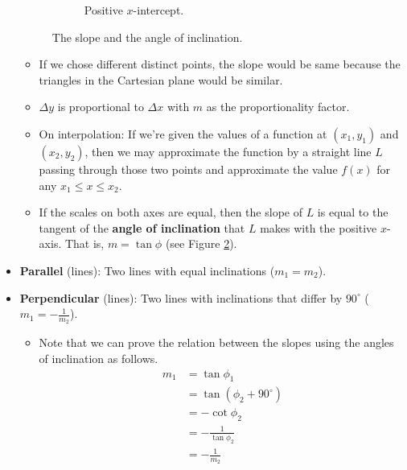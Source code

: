 \documentclass[../main.tex]{subfiles}
\begin{document}
\begin{itemize}
\begin{figure}[h!]
\begin{subfigure}[b]{0.3\linewidth}
            \caption{Positive $x$-intercept.}
            \label{fig:angleOfInclinationb}
        \end{subfigure}
        \caption{The slope and the angle of inclination.}
        \label{fig:angleOfInclination}
    \end{figure}
    \begin{itemize}
        \item If we chose different distinct points, the slope would be same because the triangles in the Cartesian plane would be similar.
        \item $\Delta y$ is proportional to $\Delta x$ with $m$ as the proportionality factor.
        \item On interpolation: If we're given the values of a function at $(x_1,y_1)$ and $(x_2,y_2)$, then we may approximate the function by a straight line $L$ passing through those two points and approximate the value $f(x)$ for any $x_1\leq x\leq x_2$.
        \item If the scales on both axes are equal, then the slope of $L$ is equal to the tangent of the \textbf{angle of inclination} that $L$ makes with the positive $x$-axis. That is, $m=\tan\phi$ (see Figure \ref{fig:angleOfInclination}).
    \end{itemize}
    \item \textbf{Parallel} (lines): Two lines with equal inclinations ($m_1=m_2$).
    \item \textbf{Perpendicular} (lines): Two lines with inclinations that differ by $90^\circ$ ($m_1=-\frac{1}{m_2}$).
    \begin{itemize}
        \item Note that we can prove the relation between the slopes using the angles of inclination as follows.
        \begin{align*}
            m_1 &= \tan\phi_1\\
            &= \tan\left( \phi_2+90^\circ \right)\\
            &= -\cot\phi_2\\
            &= -\frac{1}{\tan\phi_2}\\
            &= -\frac{1}{m_2}
        \end{align*}
    \end{itemize}
\end{itemize}
\end{document}
